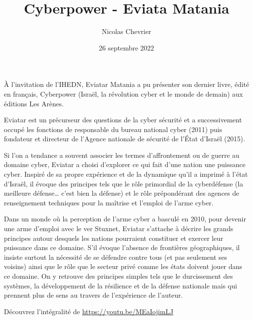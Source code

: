 \documentclass[a4paper]{article}
\title{Cyberpower - Eviata Matania}
\author{Nicolas Chevrier}
\date{26 septembre 2022}
\begin{document}
À l’invitation de l’IHEDN, Eviatar Matania a pu présenter son dernier livre, édité en français, Cyberpower (Israël, la révolution cyber et le monde de demain) aux éditions Les Arènes.

Eviatar est un précurseur des questions de la cyber sécurité et a successivement occupé les fonctions de responsable du bureau national cyber (2011) puis fondateur et directeur de l’Agence nationale de sécurité de l’État d’Israël (2015).

Si l’on a tendance a souvent associer les termes d’affrontement ou de guerre au domaine cyber, Eviatar a choisi d’explorer ce qui fait d’une nation une puissance cyber. Inspiré de sa propre expérience et de la dynamique qu’il a imprimé à l’état d’Israël, il évoque des principes tels que le rôle primordial de la cyberdéfense (la meilleure défense… c’est bien la défense) et le rôle prépondérant des agences de renseignement techniques pour la maîtrise et l’emploi de l’arme cyber.

Dans un monde où la perception de l’arme cyber a basculé en 2010, pour devenir une arme d’emploi avec le ver Stuxnet, Eviatar s’attache à décrire les grands principes autour desquels les nations pourraient constituer et exercer leur puissance dans ce domaine. S’il évoque l’absence de frontières géographiques, il insiste surtout la nécessité de se défendre contre tous (et pas seulement ses voisins) ainsi que le rôle que le secteur privé comme les états doivent jouer dans ce domaine. On y retrouve des principes simples tels que le durcissement des systèmes, la développement de la résilience et de la défense nationale mais qui prennent plus de sens au travers de l’expérience de l’auteur.

Découvrez l'intégralité de \href{la conférence ici}{https://youtu.be/MEaIojimLJ}
\end{document}

